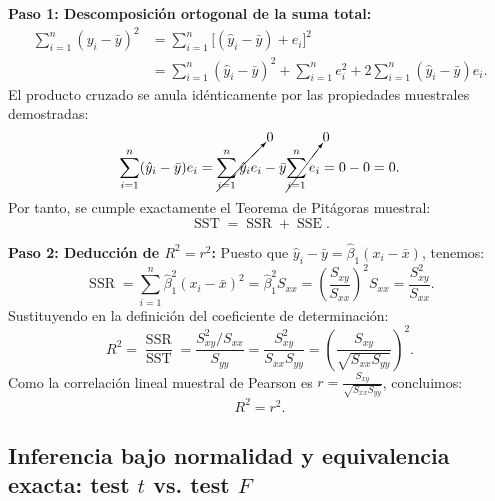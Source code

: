 \documentclass[11pt,a4paper]{article}
\begin{document}
\begin{demobox}[Demostración de $\operatorname{SST} = \operatorname{SSR} + \operatorname{SSE}$ y $R^2 = r^2$]
\textbf{Paso 1: Descomposición ortogonal de la suma total:}
\begin{align}
\sum_{i=1}^n (y_i - \bar{y})^2 &= \sum_{i=1}^n \big[ (\hat{y}_i - \bar{y}) + e_i \big]^2 \\
&= \sum_{i=1}^n (\hat{y}_i - \bar{y})^2 + \sum_{i=1}^n e_i^2 + 2\sum_{i=1}^n (\hat{y}_i - \bar{y})e_i.
\end{align}
El producto cruzado se anula idénticamente por las propiedades muestrales demostradas:
\begin{equation}
\sum_{i=1}^n (\hat{y}_i - \bar{y})e_i = \cancelto{0}{\sum_{i=1}^n \hat{y}_i e_i} - \bar{y}\cancelto{0}{\sum_{i=1}^n e_i} = 0 - 0 = 0.
\end{equation}
Por tanto, se cumple exactamente el Teorema de Pitágoras muestral:
\begin{equation}
\operatorname{SST} = \operatorname{SSR} + \operatorname{SSE}.
\end{equation}

\textbf{Paso 2: Deducción de $R^2 = r^2$:}  
Puesto que $\hat{y}_i - \bar{y} = \hat{\beta}_1(x_i - \bar{x})$, tenemos:
\begin{equation}
\operatorname{SSR} = \sum_{i=1}^n \hat{\beta}_1^2 (x_i - \bar{x})^2 = \hat{\beta}_1^2 S_{xx} = \left(\frac{S_{xy}}{S_{xx}}\right)^2 S_{xx} = \frac{S_{xy}^2}{S_{xx}}.
\end{equation}
Sustituyendo en la definición del coeficiente de determinación:
\begin{equation}
R^2 = \frac{\operatorname{SSR}}{\operatorname{SST}} = \frac{S_{xy}^2 / S_{xx}}{S_{yy}} = \frac{S_{xy}^2}{S_{xx}S_{yy}} = \left(\frac{S_{xy}}{\sqrt{S_{xx}S_{yy}}}\right)^2.
\end{equation}
Como la correlación lineal muestral de Pearson es $r = \frac{S_{xy}}{\sqrt{S_{xx}S_{yy}}}$, concluimos:
\begin{equation}
R^2 = r^2.
\end{equation}
\end{demobox}



\subsection{Inferencia bajo normalidad y equivalencia exacta: test $t$ vs. test $F$}
\end{document}
